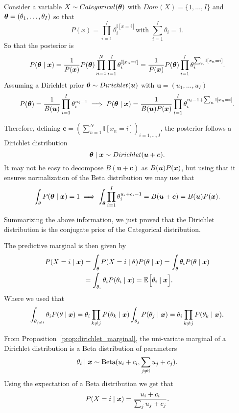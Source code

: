 Consider a variable \(X \sim Categorical(\bm{\theta})\) with
 \(Dom(X) = \{1, \dots, I\} \) and \(\bm{\theta} = (\theta_{1},\dots, \theta_{I})\) so that
 \[
   P(x) = \prod_{i = 1}^{I}\theta_{i}^{\mathbb{I}[x = i]} \text{
   with  } \sum_{i=1}^{I}\theta_{i} = 1.
\]
So that the posterior is
\[
  P(\bm{\theta} \mid \bm{x}) = \frac{1}{P(\bm{x})} P(\bm{\theta}) \prod_{n = 1}^{N}\prod_{i =1 }^{I}\theta_{i}^{\mathbb{I}[x_{n} = i]} =  \frac{1}{P(\bm{x})} P(\bm{\theta}) \prod_{i = 1}^{I} \theta_{i}^{\sum_{n} \mathbb{I}[x_{n}=i]}.
\]
Assuming a Dirichlet prior \(\bm{\theta} \sim Dirichlet(\bm{u})\) with \( \bm{u} = (u_{1}, \dots, u_{I})\)
\[
  P(\bm{\theta}) = \frac{1}{B(\bm{u})}\prod_{i =1}^{I}\theta_{i}^{u_{i}-1} \implies P(\bm{\theta} \mid \bm{x}) = \frac{1}{B(\bm{u})P(\bm{x})}\prod_{i=1}^{I}\theta_{i}^{u_{i}-1 + \sum_{n}\mathbb{I}[x_{n} = i]}.
\]

Therefore, defining \(\bm{c} = ( \sum_{n=1}^{N}\mathbb{I}[x_{n} = i])_{i = 1,\dots,I}\), the posterior follows a Dirichlet distribution
\[
  \bm{\theta} \mid \bm{x} \sim Dirichlet(\bm{u} + \bm{c}).
\]
It may not be easy to decompose \(B(\bm{u} + \bm{c})\) as \(B(\bm{u})P(\bm{x})\), but using that it ensures normalization of the Beta distribution we may use that
\[
  \int_{\theta} P(\bm{\theta} \mid \bm{x}) = 1 \implies \int_{\bm{\theta}}\prod_{i=1}^{I}\theta_{i}^{u_{i}+c_{i}-1} = B(\bm{u} + \bm{c}) = B(\bm{u})P(\bm{x}).
\]

\begin{remark}
Summarizing the above information, we just proved that the Dirichlet distribution is the conjugate prior of the Categorical distribution.
\end{remark}

The predictive marginal is then given by
\[
  \begin{aligned}
    P(X=i \mid \bm{x}) &= \int_{\theta}P(X=i \mid \theta)P(\theta \mid \bm{x}) =  \int_{\theta}\theta_{i}P(\theta \mid \bm{x})\\
    &=  \int_{\theta_{i}}\theta_{i}P(\theta_{i} \mid \bm{x}) = \mathbb{E}_{}\Big[\theta_{i} \mid \bm{x}\Big].
\end{aligned}
\]
Where we used that
\[
  \int_{\theta_{j \neq i}}\theta_{i} P(\theta \mid \bm{x}) = \theta_{i}\prod_{k\neq j}P(\theta_{k} \mid \bm{x}) \int_{\theta_{j}}P(\theta_{j}\mid \bm{x}) = \theta_{i} \prod_{k \neq j}P(\theta_{k} \mid \bm{x}).
\]

From Proposition~\ref{prop:dirichlet_marginal}, the uni-variate marginal of a Dirichlet distribution is a Beta distribution of parameters
\[
  \theta_{i} \mid \bm{x} \sim \text{Beta}(u_{i} + c_{i}, \sum_{j\neq i} u_{j} + c_{j}).
\]
Using the expectation of a Beta distribution we get that
\[
  P(X = i \mid \bm{x}) = \frac{u_{i} + c_{i}}{\sum_{j}u_{j} + c_{j}}.
\]

